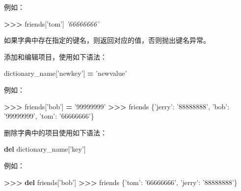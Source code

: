 \documentclass[]{ctexbook}
\newenvironment{Shaded}{\begin{snugshade}}{\end{snugshade}}
\newcommand{\CommentTok}[1]{\textcolor[rgb]{0.56,0.35,0.01}{\textit{#1}}}
\newcommand{\KeywordTok}[1]{\textcolor[rgb]{0.13,0.29,0.53}{\textbf{#1}}}
\newcommand{\NormalTok}[1]{#1}
\newcommand{\OperatorTok}[1]{\textcolor[rgb]{0.81,0.36,0.00}{\textbf{#1}}}
\newcommand{\StringTok}[1]{\textcolor[rgb]{0.31,0.60,0.02}{#1}}
\begin{document}
例如：

\begin{Shaded}
\begin{Highlighting}[]
\OperatorTok{>>>}\NormalTok{ friends[}\StringTok{'tom'}\NormalTok{]}
\CommentTok{'66666666'}
\end{Highlighting}
\end{Shaded}

如果字典中存在指定的键名，则返回对应的值，否则抛出键名异常。

添加和编辑项目，使用如下语法：

\begin{Shaded}
\begin{Highlighting}[]
\NormalTok{dictionary_name[}\StringTok{'newkey'}\NormalTok{] }\OperatorTok{=} \StringTok{'newvalue'}
\end{Highlighting}
\end{Shaded}

例如：

\begin{Shaded}
\begin{Highlighting}[]
\OperatorTok{>>>}\NormalTok{ friends[}\StringTok{'bob'}\NormalTok{] }\OperatorTok{=} \StringTok{'99999999'}
\OperatorTok{>>>}\NormalTok{ friends}
\NormalTok{\{}\StringTok{'jerry'}\NormalTok{: }\StringTok{'88888888'}\NormalTok{, }\StringTok{'bob'}\NormalTok{: }\StringTok{'99999999'}\NormalTok{, }\StringTok{'tom'}\NormalTok{: }\StringTok{'66666666'}\NormalTok{\}}
\end{Highlighting}
\end{Shaded}

删除字典中的项目使用如下语法：

\begin{Shaded}
\begin{Highlighting}[]
\KeywordTok{del}\NormalTok{ dictionary_name[}\StringTok{'key'}\NormalTok{]}
\end{Highlighting}
\end{Shaded}

例如：

\begin{Shaded}
\begin{Highlighting}[]
\OperatorTok{>>>}  \KeywordTok{del}\NormalTok{ friends[}\StringTok{'bob'}\NormalTok{]}
\OperatorTok{>>>}\NormalTok{  friends}
\NormalTok{\{}\StringTok{'tom'}\NormalTok{: }\StringTok{'66666666'}\NormalTok{, }\StringTok{'jerry'}\NormalTok{: }\StringTok{'88888888'}\NormalTok{\}}
\end{Highlighting}
\end{Shaded}
\end{document}
